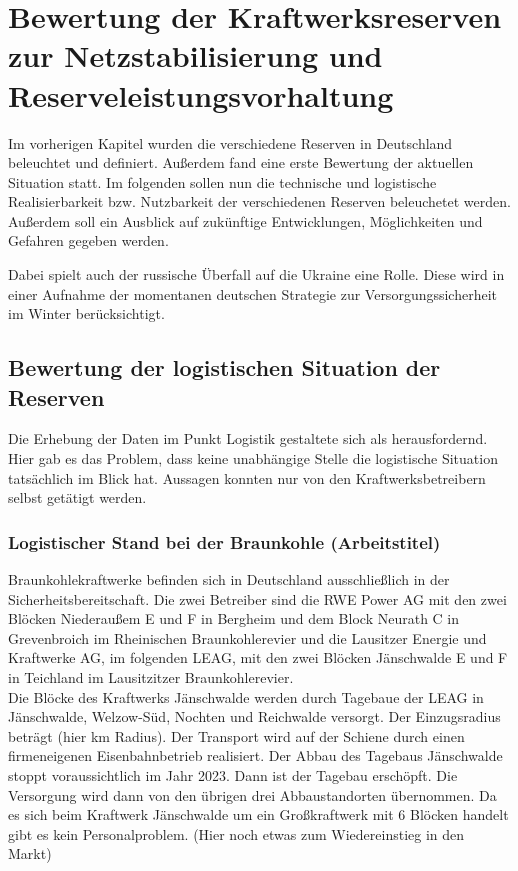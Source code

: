 \section{Bewertung der Kraftwerksreserven zur Netzstabilisierung und Reserveleistungsvorhaltung}

Im vorherigen Kapitel wurden die verschiedene Reserven in Deutschland beleuchtet und definiert. Außerdem fand eine erste Bewertung der aktuellen Situation statt. Im folgenden sollen nun die technische und logistische Realisierbarkeit bzw. Nutzbarkeit der verschiedenen Reserven beleuchetet werden. Außerdem soll ein Ausblick auf zukünftige Entwicklungen, Möglichkeiten und Gefahren gegeben werden.

Dabei spielt auch der russische Überfall auf die Ukraine eine Rolle. Diese wird in einer Aufnahme der momentanen deutschen Strategie zur Versorgungssicherheit im Winter berücksichtigt.

	\subsection{Bewertung der logistischen Situation der Reserven}
	Die Erhebung der Daten im Punkt Logistik gestaltete sich als herausfordernd. Hier gab es das Problem, dass keine unabhängige Stelle die logistische Situation tatsächlich im Blick hat. Aussagen konnten nur von den Kraftwerksbetreibern selbst getätigt werden.
	
		\subsubsection{Logistischer Stand bei der Braunkohle (Arbeitstitel)} \label{sect: Braunkohle}
		Braunkohlekraftwerke befinden sich in Deutschland ausschließlich in der Sicherheitsbereitschaft. Die zwei Betreiber sind die RWE Power AG mit den zwei Blöcken Niederaußem E und F in Bergheim und dem Block Neurath C in Grevenbroich im Rheinischen Braunkohlerevier und die Lausitzer Energie und Kraftwerke AG, im folgenden LEAG, mit den zwei Blöcken Jänschwalde E und F in Teichland im Lausitzitzer Braunkohlerevier. \\
		
		Die Blöcke des Kraftwerks Jänschwalde werden durch Tagebaue der LEAG in Jänschwalde, Welzow-Süd, Nochten und Reichwalde versorgt. Der Einzugsradius beträgt (hier km Radius). Der Transport wird auf der Schiene durch einen firmeneigenen Eisenbahnbetrieb realisiert. Der Abbau des Tagebaus Jänschwalde stoppt voraussichtlich im Jahr 2023. Dann ist der Tagebau erschöpft. Die Versorgung wird dann von den übrigen drei Abbaustandorten übernommen.
		Da es sich beim Kraftwerk Jänschwalde um ein Großkraftwerk mit 6 Blöcken handelt gibt es kein Personalproblem. 
		(Hier noch etwas zum Wiedereinstieg in den Markt)\\
		
